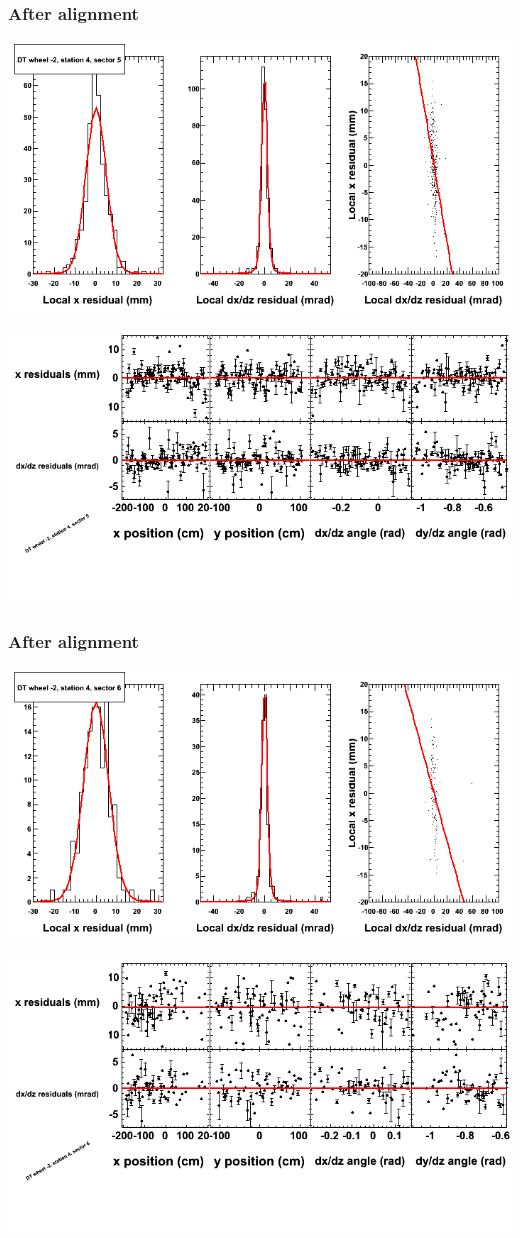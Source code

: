 \documentclass[compress]{beamer}
\begin{document}
\begin{frame}
\frametitle{After alignment}
\includegraphics[width=0.7\linewidth]{NOV4_fitfunctions/MBwhAst4sec05_bellcurves.png}

\includegraphics[width=0.7\linewidth]{NOV4_fitfunctions/MBwhAst4sec05_polynomials.png}
\end{frame}

\begin{frame}
\frametitle{After alignment}
\includegraphics[width=0.7\linewidth]{NOV4_fitfunctions/MBwhAst4sec06_bellcurves.png}

\includegraphics[width=0.7\linewidth]{NOV4_fitfunctions/MBwhAst4sec06_polynomials.png}
\end{frame}
\end{document}
